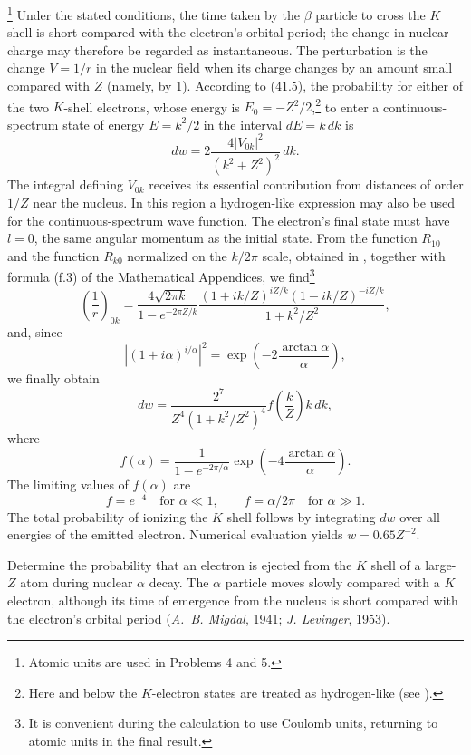 \SolutionHeading\footnote{Atomic units are used in Problems 4 and 5.} Under
the stated conditions, the time taken by the $\beta$ particle to cross the
$K$ shell is short compared with the electron's orbital period; the change in
nuclear charge may therefore be regarded as instantaneous. The perturbation
is the change $V=1/r$ in the nuclear field when its charge changes by an
amount small compared with $Z$ (namely, by 1). According to (41.5), the
probability for either of the two $K$-shell electrons, whose energy is
$E_0=-Z^2/2$,\footnote{Here and below the $K$-electron states are treated as
hydrogen-like (see ).} to enter a continuous-spectrum state of energy
$E=k^2/2$ in the interval $dE=k\,dk$ is
\[
  dw=2\frac{4|V_{0k}|^2}{(k^2+Z^2)^2}\,dk.
\]
The integral defining $V_{0k}$ receives its essential contribution from
distances of order $1/Z$ near the nucleus. In this region a hydrogen-like
expression may also be used for the continuous-spectrum wave function. The
electron's final state must have $l=0$, the same angular momentum as the
initial state. From the function $R_{10}$ and the function $R_{k0}$ normalized
on the $k/2\pi$ scale, obtained in ,
together with formula (f.3) of the Mathematical Appendices, we find\footnote{It
is convenient during the calculation to use Coulomb units, returning to
atomic units in the final result.}
\[
  \left(\frac1r\right)_{0k}
  =\frac{4\sqrt{2\pi k}}{1-e^{-2\pi Z/k}}
   \frac{(1+ik/Z)^{iZ/k}(1-ik/Z)^{-iZ/k}}{1+k^2/Z^2},
\]
and, since
\[
  |(1+i\alpha)^{i/\alpha}|^2
  =\exp\left(-2\frac{\arctan\alpha}{\alpha}\right),
\]
we finally obtain
\[
  dw=\frac{2^7}{Z^4(1+k^2/Z^2)^4}f\left(\frac kZ\right)k\,dk,
\]
where
\[
  f(\alpha)=\frac1{1-e^{-2\pi/\alpha}}
  \exp\left(-4\frac{\arctan\alpha}{\alpha}\right).
\]
The limiting values of $f(\alpha)$ are
\[
  f=e^{-4}\quad\text{for }\alpha\ll1,\qquad
  f=\alpha/2\pi\quad\text{for }\alpha\gg1.
\]
The total probability of ionizing the $K$ shell follows by integrating $dw$
over all energies of the emitted electron. Numerical evaluation yields
$w=0.65Z^{-2}$.

 Determine the probability that an electron is ejected
from the $K$ shell of a large-$Z$ atom during nuclear $\alpha$ decay. The
$\alpha$ particle moves slowly compared with a $K$ electron, although its
time of emergence from the nucleus is short compared with the electron's
orbital period (\emph{A.~B. Migdal}, 1941; \emph{J. Levinger}, 1953).

